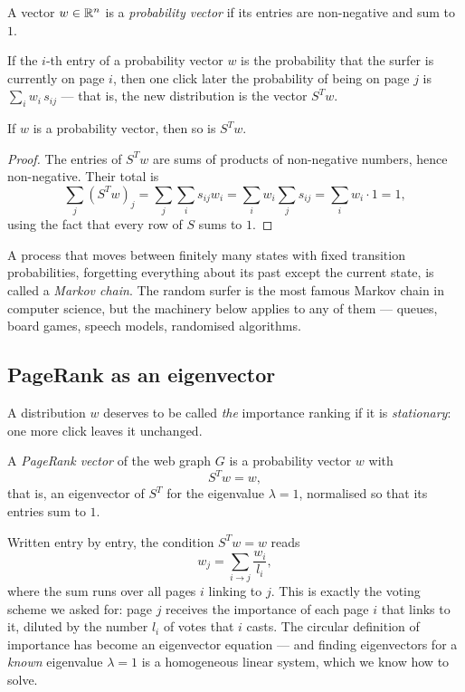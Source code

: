 \begin{definition}
A vector $w\in\mathbb{R}^n$ is a \emph{probability vector} if its entries are non-negative and sum to $1$.
\end{definition}

If the $i$-th entry of a probability vector $w$ is the probability that the surfer is currently on page
$i$, then one click later the probability of being on page $j$ is $\sum_i w_i\, s_{ij}$ — that is, the
new distribution is the vector $S^T w$.

\begin{fact}
If $w$ is a probability vector, then so is $S^T w$.
\end{fact}

\begin{proof}
The entries of $S^T w$ are sums of products of non-negative numbers, hence non-negative. Their total is
\[
\sum_{j} (S^T w)_j = \sum_j \sum_i s_{ij} w_i = \sum_i w_i \sum_j s_{ij} = \sum_i w_i \cdot 1 = 1,
\]
using the fact that every row of $S$ sums to $1$.
\end{proof}

\begin{remark}
A process that moves between finitely many states with fixed transition probabilities, forgetting
everything about its past except the current state, is called a \emph{Markov chain}. The random surfer is
the most famous Markov chain in computer science, but the machinery below applies to any of them —
queues, board games, speech models, randomised algorithms.
\end{remark}

\subsection{PageRank as an eigenvector}

A distribution $w$ deserves to be called \emph{the} importance ranking if it is \emph{stationary}: one
more click leaves it unchanged.

\begin{definition}
A \emph{PageRank vector} of the web graph $G$ is a probability vector $w$ with
\[
S^T w = w,
\]
that is, an eigenvector of $S^T$ for the eigenvalue $\lambda = 1$, normalised so that its entries sum to
$1$.
\end{definition}

Written entry by entry, the condition $S^T w = w$ reads
\[
w_j = \sum_{i\to j} \frac{w_i}{l_i},
\]
where the sum runs over all pages $i$ linking to $j$. This is exactly the voting scheme we asked for:
page $j$ receives the importance of each page $i$ that links to it, diluted by the number $l_i$ of votes
that $i$ casts. The circular definition of importance has become an eigenvector equation — and finding
eigenvectors for a \emph{known} eigenvalue $\lambda = 1$ is a homogeneous linear system, which we know how
to solve.

